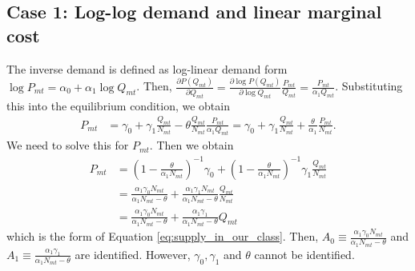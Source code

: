 \documentclass[11pt, a4paper]{article}
\begin{document}
\subsection{Case 1: Log-log demand and linear marginal cost}
The inverse demand is defined as log-linear demand form $\log P_{mt}=\alpha_0+\alpha_1 \log Q_{mt}$. Then, $\frac{\partial P\left(Q_{m t}\right)}{\partial Q_{mt}}=\frac{\partial \log P\left(Q_{m t}\right)}{\partial \log Q_{mt}}\frac{P_{mt}}{Q_{mt}}=\frac{P_{mt}}{\alpha_1 Q_{mt}}$. Substituting this into the equilibrium condition, we obtain
    \begin{align}
        P_{m t}&=\gamma_0+\gamma_1 \frac{Q_{mt}}{N_{mt}}-\theta \frac{Q_{mt}}{N_{mt}}\frac{P_{mt}}{\alpha_1 Q_{mt}}=\gamma_0+\gamma_1 \frac{Q_{mt}}{N_{mt}}+ \frac{\theta}{\alpha_1}\frac{P_{mt}}{N_{mt}}.
    \end{align}
    We need to solve this for $P_{mt}$. Then we obtain
    \begin{align*}
        P_{m t}&=\left(1-\frac{\theta}{\alpha_1 N_{mt}}\right)^{-1}\gamma_0+\left(1-\frac{\theta}{\alpha_1 N_{mt}}\right)^{-1}\gamma_1 \frac{Q_{mt}}{N_{mt}}\\ 
        & =\frac{\alpha_1 \gamma_0 N_{mt}}{\alpha_1 N_{mt}-\theta}+\frac{\alpha_1 \gamma_1 N_{mt}}{\alpha_1 N_{mt}-\theta} \frac{Q_{mt}}{N_{mt}}\\
        & =\frac{\alpha_1 \gamma_0 N_{mt}}{\alpha_1 N_{mt}-\theta}+\frac{\alpha_1 \gamma_1}{\alpha_1 N_{mt}-\theta} Q_{mt}
    \end{align*}
    which is the form of Equation \eqref{eq:supply_in_our_class}.
    Then, $A_0\equiv\frac{\alpha_1 \gamma_0 N_{mt}}{\alpha_1 N_{mt}-\theta}$ and $A_1\equiv\frac{\alpha_1 \gamma_1}{\alpha_1 N_{mt}-\theta}$ are identified. However, $\gamma_0,\gamma_1$ and $\theta$ cannot be identified. 
\end{document}
